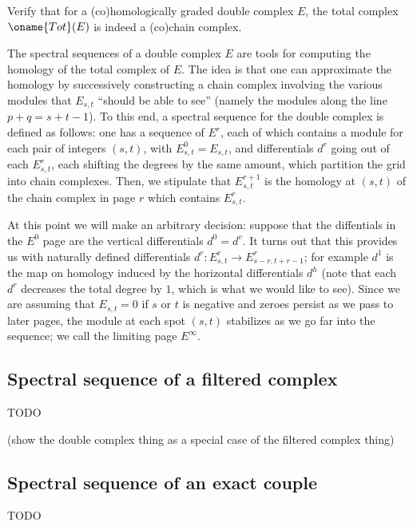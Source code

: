 \documentclass[10pt]{article}
\begin{document}
\begin{exercise}
    \label{exer:total-complex-is-chain-complex}
    Verify that for a (co)homologically graded double complex $E$,
    the total complex $\oname{Tot}(E)$ is indeed a (co)chain complex.
\end{exercise}

The spectral sequences of a double complex $E$ are tools for computing
the homology of the total complex of $E$.
The idea is that one can approximate the homology
by successively constructing a chain complex involving the various modules
that $E_{s,t}$ ``should be able to see''
(namely the modules along the line $p+q=s+t-1$).
To this end, a spectral sequence for the double complex
is defined as follows: one has a sequence of  $E^r$,
each of which contains a module for each pair of integers $(s,t)$,
with $E^0_{s,t} = E_{s,t}$,
and differentials $d^r$ going out of each $E^r_{s,t}$,
each shifting the degrees by the same amount,
which partition the grid into chain complexes.
Then, we stipulate that $E^{r+1}_{s,t}$ is the homology at $(s,t)$
of the chain complex in page $r$ which contains $E^r_{s,t}$.

At this point we will make an arbitrary decision:
suppose that the diffentials in the $E^0$ page
are the vertical differentials $d^0 = d^v$.
It turns out that this provides us with naturally defined differentials
$d^r\colon E^r_{s,t}\to E^r_{s-r,t+r-1}$; for example
$d^1$ is the map on homology induced by the horizontal differentials $d^h$
(note that each $d^r$ decreases the total degree by $1$,
which is what we would like to see).
Since we are assuming that $E_{s,t} = 0$ if $s$ or $t$ is negative
and zeroes persist as we pass to later pages,
the module at each spot $(s,t)$ stabilizes as we go far into the sequence;
we call the limiting page $E^\infty$.



\subsection{Spectral sequence of a filtered complex}
TODO

(show the double complex thing
as a special case of the filtered complex thing)

\subsection{Spectral sequence of an exact couple}
TODO
\end{document}
